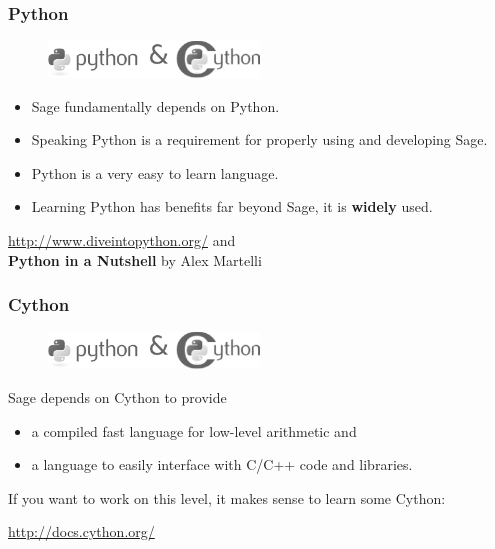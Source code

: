 \documentclass[11pt,blackandwhite]{beamer}
\renewcommand{\emph}[1]{{\color{black}\bf #1}}
\begin{document}
\begin{frame}
\frametitle{Python} 
\begin{figure}
 \centering
 \includegraphics[width=0.5\textwidth]{python-and-cython.png}
\end{figure}

\begin{itemize}
\item Sage fundamentally depends on Python.
\item Speaking Python is a requirement for properly using and developing Sage.
\item Python is a very easy to learn language.
\item Learning Python has benefits far beyond Sage, it is \emph{widely} used.
\end{itemize}

\begin{center}
 \url{http://www.diveintopython.org/} and\\
 \emph{Python in a Nutshell} by Alex Martelli
\end{center}
\end{frame}

\begin{frame}
\frametitle{Cython} 

\begin{figure}
 \centering
 \includegraphics[width=0.5\textwidth]{python-and-cython.png}
\end{figure}

Sage depends on Cython to provide

\begin{itemize}
 \item a compiled fast language for low-level arithmetic and
 \item a language to easily interface with C/C++ code and libraries.
\end{itemize}

If you want to work on this level, it makes sense to learn some Cython:

\begin{center}
 \url{http://docs.cython.org/}
\end{center}

\end{frame}
\end{document}
